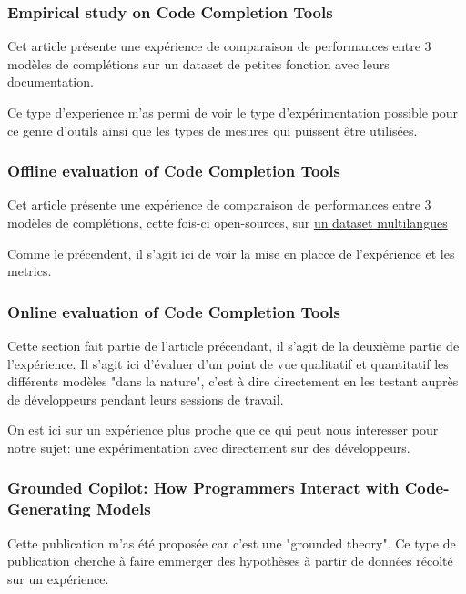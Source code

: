 \subsubsection{Empirical study on Code Completion Tools \cite{evalcodecompquality}}

Cet article présente une expérience de comparaison de performances entre
3 modèles de complétions sur un dataset de petites fonction avec leurs documentation.

Ce type d'experience m'as permi de voir le type d'expérimentation possible pour ce genre d'outils ainsi que
les types de mesures qui puissent être utilisées.


\subsubsection{Offline evaluation of Code Completion Tools \cite{llm-online-offline}}

Cet article présente une expérience de comparaison de performances entre
3 modèles de complétions, cette fois-ci open-sources, sur \href{https://github.com/VHellendoorn/Code-LMs#datasets}{un dataset multilangues}

Comme le précendent, il s'agit ici de voir la mise en placce de l'expérience et les metrics.


\subsubsection{Online evaluation of Code Completion Tools \cite{llm-online-offline}}

Cette section fait partie de l'article précendant, il s'agit de la deuxième partie de l'expérience.
Il s'agit ici d'évaluer d'un point de vue qualitatif et quantitatif les différents modèles "dans la nature",
c'est à dire directement en les testant auprès de développeurs pendant leurs sessions de travail.

On est ici sur un expérience plus proche que ce qui peut nous interesser pour notre sujet: une expérimentation avec directement sur des développeurs.


\subsubsection{Grounded Copilot: How Programmers Interact with Code-Generating Models \cite{grouded}}

Cette publication m'as été proposée car c'est une "grounded theory".
Ce type de publication cherche à faire emmerger des hypothèses à partir de données récolté sur un expérience.

